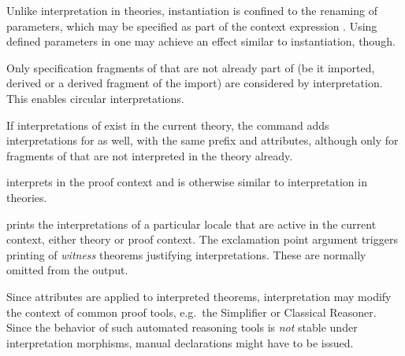 \begin{isabellebody}
\begin{isamarkuptext}
\begin{descr}
  Unlike interpretation in theories, instantiation is confined to the
  renaming of parameters, which may be specified as part of the
  context expression .  Using defined parameters in  one may achieve an effect similar to instantiation, though.

  Only specification fragments of  that are not already
  part of  (be it imported, derived or a derived fragment
  of the import) are considered by interpretation.  This enables
  circular interpretations.

  If interpretations of  exist in the current theory, the
  command adds interpretations for  as well, with the same
  prefix and attributes, although only for fragments of 
  that are not interpreted in the theory already.

  \item [\mbox{\isa{\isacommand{interpret}}}~\isa{expr\ insts\ {\isasymWHERE}\ eqns}]
  interprets  in the proof context and is otherwise
  similar to interpretation in theories.

  \item [\mbox{\isa{\isacommand{print{\isacharunderscore}interps}}}~\isa{loc}] prints the
  interpretations of a particular locale  that are active
  in the current context, either theory or proof context.  The
  exclamation point argument triggers printing of \emph{witness}
  theorems justifying interpretations.  These are normally omitted
  from the output.
  
  \end{descr}

  \begin{warn}
    Since attributes are applied to interpreted theorems,
    interpretation may modify the context of common proof tools, e.g.\
    the Simplifier or Classical Reasoner.  Since the behavior of such
    automated reasoning tools is \emph{not} stable under
    interpretation morphisms, manual declarations might have to be
    issued.
  \end{warn}


\end{isamarkuptext}
\end{isabellebody}
